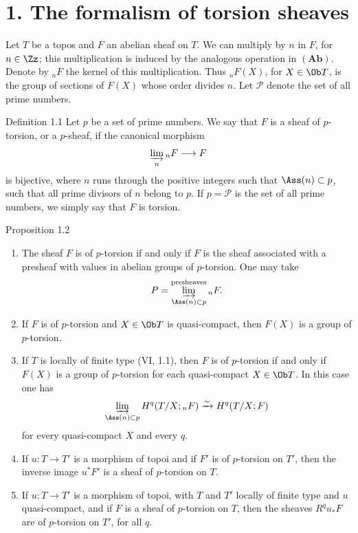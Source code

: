 \section*{1. The formalism of torsion sheaves}

Let \(T\) be a topos and \(F\) an abelian sheaf on \(T\). We can multiply by \(n\) in \(F\), for \(n\in\Zz\); this multiplication is induced by the analogous operation in \((\mathbf{Ab})\). Denote by \({}_nF\) the kernel of this multiplication. Thus \({}_nF(X)\), for \(X\in\Ob T\), is the group of sections of \(F(X)\) whose order divides \(n\). Let \(\mathcal P\) denote the set of all prime numbers.

\begin{statement}{Definition 1.1}
Let \(p\) be a set of prime numbers. We say that \(F\) is a sheaf of \(p\)-torsion, or a \(p\)-sheaf, if the canonical morphism
\[
\varinjlim_n {}_nF\longrightarrow F
\]
is bijective, where \(n\) runs through the positive integers such that \(\Ass(n)\subset p\), \ie such that all prime divisors of \(n\) belong to \(p\). If \(p=\mathcal P\) is the set of all prime numbers, we simply say that \(F\) is torsion.
\end{statement}

\begin{statement}{Proposition 1.2}
\begin{enumerate}[label=(\roman*)]
\item The sheaf \(F\) is of \(p\)-torsion if and only if \(F\) is the sheaf associated with a presheaf with values in abelian groups of \(p\)-torsion. One may take
\[
P=\varinjlim_{\Ass(n)\subset p}^{\mathrm{presheaves}}{}_nF.
\]
\item If \(F\) is of \(p\)-torsion and \(X\in\Ob T\) is quasi-compact, then \(F(X)\) is a group of \(p\)-torsion.
\item If \(T\) is locally of finite type (VI, 1.1), then \(F\) is of \(p\)-torsion if and only if \(F(X)\) is a group of \(p\)-torsion for each quasi-compact \(X\in\Ob T\). In this case one has
\[
\varinjlim_{\Ass(n)\subset p}H^q(T/X;{}_nF)\xrightarrow{\sim}H^q(T/X;F)
\]
for every quasi-compact \(X\) and every \(q\).
\item If \(u:T\to T'\) is a morphism of topoi and if \(F'\) is of \(p\)-torsion on \(T'\), then the inverse image \(u^*F'\) is a sheaf of \(p\)-torsion on \(T\).
\item If \(u:T\to T'\) is a morphism of topoi, with \(T\) and \(T'\) locally of finite type and \(u\) quasi-compact, and if \(F\) is a sheaf of \(p\)-torsion on \(T\), then the sheaves \(R^qu_*F\) are of \(p\)-torsion on \(T'\), for all \(q\).
\end{enumerate}
\end{statement}

